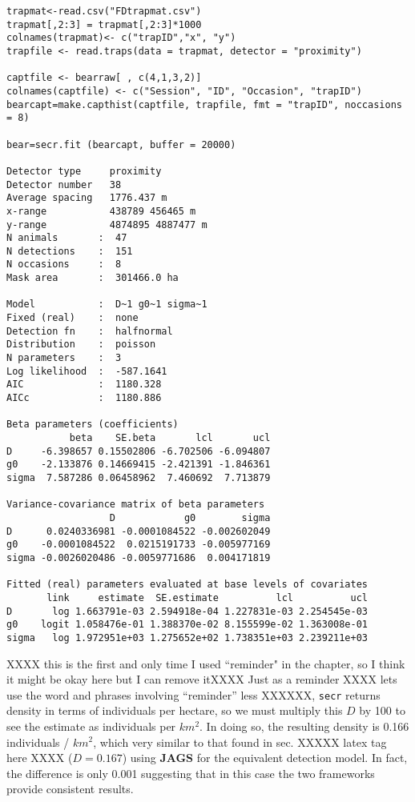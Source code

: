 {\small
\begin{verbatim}
trapmat<-read.csv("FDtrapmat.csv")
trapmat[,2:3] = trapmat[,2:3]*1000
colnames(trapmat)<- c("trapID","x", "y")
trapfile <- read.traps(data = trapmat, detector = "proximity")

captfile <- bearraw[ , c(4,1,3,2)]
colnames(captfile) <- c("Session", "ID", "Occasion", "trapID")
bearcapt=make.capthist(captfile, trapfile, fmt = "trapID", noccasions = 8)

bear=secr.fit (bearcapt, buffer = 20000)

Detector type     proximity
Detector number   38
Average spacing   1776.437 m
x-range           438789 456465 m
y-range           4874895 4887477 m
N animals       :  47
N detections    :  151
N occasions     :  8
Mask area       :  301466.0 ha

Model           :  D~1 g0~1 sigma~1
Fixed (real)    :  none
Detection fn    :  halfnormal
Distribution    :  poisson
N parameters    :  3
Log likelihood  :  -587.1641
AIC             :  1180.328
AICc            :  1180.886

Beta parameters (coefficients)
           beta    SE.beta       lcl       ucl
D     -6.398657 0.15502806 -6.702506 -6.094807
g0    -2.133876 0.14669415 -2.421391 -1.846361
sigma  7.587286 0.06458962  7.460692  7.713879

Variance-covariance matrix of beta parameters
                  D            g0        sigma
D      0.0240336981 -0.0001084522 -0.002602049
g0    -0.0001084522  0.0215191733 -0.005977169
sigma -0.0026020486 -0.0059771686  0.004171819

Fitted (real) parameters evaluated at base levels of covariates
       link     estimate  SE.estimate          lcl          ucl
D       log 1.663791e-03 2.594918e-04 1.227831e-03 2.254545e-03
g0    logit 1.058476e-01 1.388370e-02 8.155599e-02 1.363008e-01
sigma   log 1.972951e+03 1.275652e+02 1.738351e+03 2.239211e+03
\end{verbatim}
}


XXXX this is the first and only time I used ``reminder" in the chapter,
 so I think it might be okay here but I can remove itXXXX
Just as a reminder XXXX lets use the word and phrases involving
``reminder'' less XXXXXX, \mbox{\tt secr} returns density in terms of
individuals per
hectare, so we must multiply this $D$ by 100 to see the estimate as
individuals per $km^2$.  In doing so, the resulting density is 0.166
individuals / $km^2$, which very similar to that found in sec. XXXXX
latex tag here XXXX ($D = 0.167$)
using {\bf JAGS} for the equivalent detection model. In fact, the difference
is only 0.001 suggesting that in this case the two frameworks provide consistent
results.

